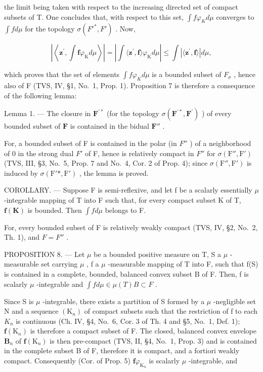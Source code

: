 the limit being taken with respect to the increasing directed set of compact subsets of T. One concludes that, with respect to this set, \(\int f\varphi_{K}d\mu\) converges to \(\int f d\mu\) for the topology \(\sigma(F'^{*},F')\) . Now,

\[
\left| \left\langle \mathbf {z} ^ {\prime}, \int \mathbf {f} \varphi_ {\mathrm{K}} d \mu \right\rangle \right| = \left| \int \langle \mathbf {z} ^ {\prime}, \mathbf {f} \rangle \varphi_ {\mathrm{K}} d \mu \right| \leqslant \int | \langle \mathbf {z} ^ {\prime}, \mathbf {f} \rangle | d \mu ,
\]

which proves that the set of elements \(\int f\varphi_{K}d\mu\) is a bounded subset of \(F_{\sigma}\) , hence also of F (TVS, IV, §1, No.~1, Prop. 1). Proposition 7 is therefore a consequence of the following lemma:

Lemma 1. --- The closure in \(\mathbf{F}^{\prime*}\) (for the topology \(\sigma(\mathbf{F}^{\prime*},\mathbf{F}^{\prime})\) ) of every bounded subset of \(\mathbf{F}\) is contained in the bidual \(\mathbf{F}''\) .

For, a bounded subset of F is contained in the polar (in \(F''\) ) of a neighborhood of 0 in the strong dual \(F'\) of F, hence is relatively compact in \(F''\) for \(\sigma(\mathrm{F}'',\mathrm{F}')\) (TVS, III, §3, No.~5, Prop. 7 and No.~4, Cor. 2 of Prop. 4); since \(\sigma(\mathrm{F}'',\mathrm{F}')\) is induced by \(\sigma(\mathrm{F}'*,\mathrm{F}')\) , the lemma is proved.

COROLLARY. --- Suppose F is semi-reflexive, and let f be a scalarly essentially \(\mu\) -integrable mapping of T into F such that, for every compact subset K of T, \(\mathbf{f}(\mathbf{K})\) is bounded. Then \(\int f d\mu\) belongs to F.

For, every bounded subset of F is relatively weakly compact (TVS, IV, §2, No.~2, Th. 1), and \(F = F''\) .

PROPOSITION 8. --- Let \(\mu\) be a bounded positive measure on T, S a \(\mu\) -measurable set carrying \(\mu\) , f a \(\mu\) -measurable mapping of T into F, such that f(S) is contained in a complete, bounded, balanced convex subset B of F. Then, f is scalarly \(\mu\) -integrable and \(\int f d\mu \in \mu(T)B \subset F\) .

Since S is \(\mu\) -integrable, there exists a partition of S formed by a \(\mu\) -negligible set N and a sequence \((\mathrm{K}_{n})\) of compact subsets such that the restriction of f to each \(K_{n}\) is continuous (Ch. IV, §4, No.~6, Cor. 3 of Th. 4 and §5, No.~1, Def. 1); \(\mathbf{f}(\mathrm{K}_n)\) is therefore a compact subset of F. The closed, balanced convex envelope \(\mathbf{B}_n\) of \(\mathbf{f}(\mathrm{K}_n)\) is then pre-compact (TVS, II, §4, No.~1, Prop. 3) and is contained in the complete subset B of F, therefore it is compact, and a fortiori weakly compact. Consequently (Cor. of Prop. 5) \(\mathbf{f}\varphi_{\mathrm{K}_n}\) is scalarly \(\mu\) -integrable, and

